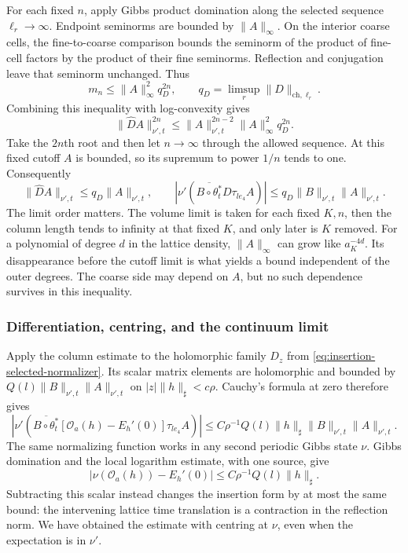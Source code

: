 \documentclass[11pt,letterpaper,reqno]{amsart}
\theoremstyle{definition}
\theoremstyle{remark}
\newcommand{\cO}{\mathcal O}
\begin{document}
For each fixed $n$, apply Gibbs product domination along the selected
sequence $\ell_r\to\infty$. Endpoint seminorms are bounded by
$\|A\|_\infty$. On the interior coarse cells, the fine-to-coarse
comparison bounds the seminorm of the product of fine-cell factors by
the product of their fine seminorms. Reflection and conjugation leave
that seminorm unchanged. Thus
\[
 m_n\le\|A\|_\infty^2q_D^{2n},
 \qquad q_D=\limsup_r\|D\|_{\mathrm{ch},\ell_r}.
\]
Combining this inequality with log-convexity gives
\begin{equation}\label{eq:reflection-column}
 \|\widehat DA\|_{\nu',t}^{2n}
       \le\|A\|_{\nu',t}^{2n-2}\|A\|_\infty^2q_D^{2n}.
\end{equation}
Take the $2n$th root and then let $n\to\infty$ through the allowed
sequence. At this fixed cutoff $A$ is bounded, so its supremum to
power $1/n$ tends to one. Consequently
\[
 \|\widehat DA\|_{\nu',t}\le q_D\|A\|_{\nu',t},\qquad
 |\nu'(\overline{B\circ\theta_t^*}D\tau_{le_4}A)|
                   \le q_D\|B\|_{\nu',t}\|A\|_{\nu',t}.
\]
The limit order matters. The volume limit is taken for each fixed
$K,n$, then the column length tends to infinity at that fixed $K$,
and only later is $K$ removed. For a polynomial of degree $d$ in
the lattice density, $\|A\|_\infty$ can grow like $a_K^{-4d}$.
Its disappearance before the cutoff limit is what yields a bound
independent of the outer degrees. The coarse side may depend on $A$,
but no such dependence survives in this inequality.

\subsubsection{Differentiation, centring, and the continuum limit}

Apply the column estimate to the holomorphic family $D_z$ from
\eqref{eq:insertion-selected-normalizer}. Its scalar matrix elements
are holomorphic and bounded by
$Q(l)\|B\|_{\nu',t}\|A\|_{\nu',t}$ on
$|z|\|h\|_\sharp<c\rho$. Cauchy's formula at zero therefore gives
\[
 \left|\nu'\left(\overline{B\circ\theta_t^*}
       [\cO_a(h)-E_h'(0)]\tau_{le_4}A\right)\right|
 \le C\rho^{-1}Q(l)\|h\|_\sharp
                              \|B\|_{\nu',t}\|A\|_{\nu',t}.
\]
The same normalizing function works in any second periodic Gibbs state
$\nu$. Gibbs domination and the local logarithm estimate, with one
source, give
\[
 |\nu(\cO_a(h))-E_h'(0)|
                       \le C\rho^{-1}Q(l)\|h\|_\sharp.
\]
Subtracting this scalar instead changes the insertion form by at most
the same bound: the intervening lattice time translation is a
contraction in the reflection norm. We have obtained the estimate
with centring at $\nu$, even when the expectation is in $\nu'$.
\end{document}
